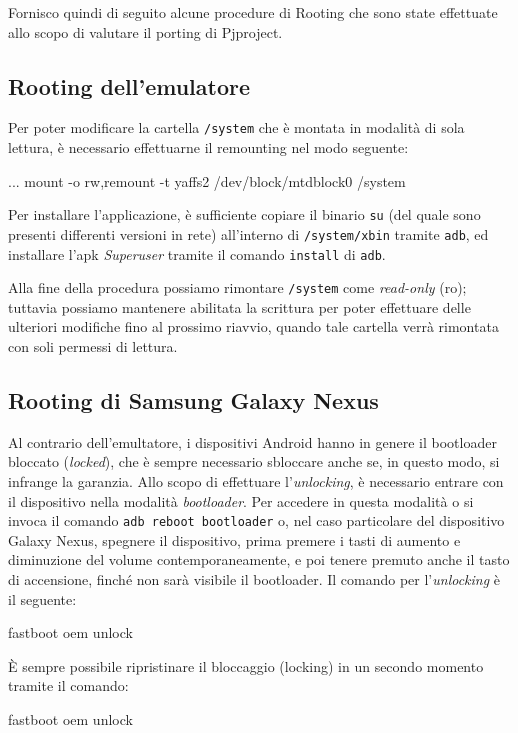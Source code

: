 Fornisco quindi di seguito alcune procedure di Rooting che sono state effettuate
allo scopo di valutare il porting di Pjproject.

\subsection{Rooting dell'emulatore}\label{subsec:rootingemu}
Per poter modificare la cartella \texttt{\small /system} che è montata in modalità di sola lettura, è necessario effettuarne il remounting nel modo seguente:
\begin{bash}
  ... mount -o rw,remount -t yaffs2 /dev/block/mtdblock0 /system
\end{bash}
Per installare l'applicazione, è sufficiente copiare il binario \texttt{\small su} (del quale sono presenti differenti versioni in rete) all'interno di \texttt{\small /system/xbin} tramite \texttt{\small adb}, ed installare l'apk \textit{Superuser} tramite il comando \texttt{\small install} di \texttt{\small adb}.

Alla fine della procedura possiamo rimontare \texttt{\small /system} come \textit{read-only} (ro); tuttavia possiamo mantenere abilitata la scrittura per poter effettuare delle ulteriori modifiche fino al prossimo riavvio, quando tale cartella verrà rimontata con soli permessi di lettura.

\subsection{Rooting di Samsung Galaxy Nexus}\label{subsec:rootingn}
 Al contrario dell'emultatore, i dispositivi Android hanno in genere il bootloader bloccato (\textit{locked}), che è sempre necessario sbloccare anche se, in questo modo, si infrange la garanzia. Allo scopo di effettuare l'\textit{unlocking}, è necessario entrare con il dispositivo nella modalità \textit{bootloader}. Per accedere in questa modalità o si invoca il comando \texttt{\small adb reboot bootloader} o, nel caso particolare del dispositivo Galaxy Nexus, spegnere il dispositivo, prima premere i tasti di aumento e diminuzione del volume contemporaneamente, e poi tenere premuto anche il tasto di accensione, finché non sarà visibile il bootloader. Il comando per l'\textit{unlocking} è il seguente:
\begin{bash} 
fastboot oem unlock
\end{bash}

 È sempre possibile ripristinare il bloccaggio (locking) in un secondo momento tramite il comando:
\begin{bash}
fastboot oem unlock
\end{bash}

